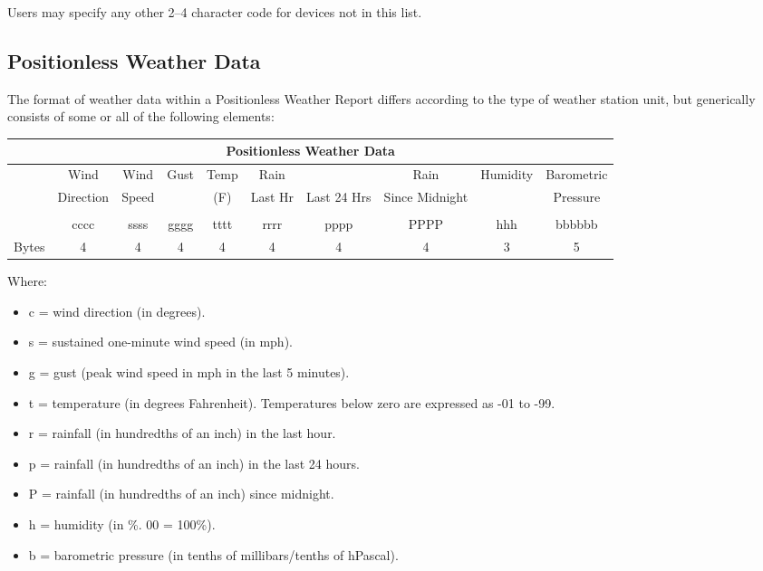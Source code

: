   Users may specify any other 2–4 character code for devices not in this list.



\subsection {Positionless Weather Data}

The format of weather data within a Positionless Weather Report differs
according to the type of weather station unit, but generically consists of some
or all of the following elements:


\begin{tabular}{r|c|c|c|c|c|c|c|c|c|}
  \hline
  \multicolumn{10}{c}{Positionless Weather Data} \\
  \hline
  & Wind  & Wind & Gust & Temp & Rain &  & Rain  & Humidity & Barometric  \\
  & Direction & Speed & & (F) & Last Hr & Last 24 Hrs & Since Midnight & & Pressure \\
  & & & & & & & &  & \\
  & cccc & ssss & gggg & tttt & rrrr & pppp & PPPP & hhh & bbbbbb \\
  \hline 
  Bytes & 4 & 4 & 4 & 4 & 4 & 4 & 4 & 3 & 5 \\
  \hline 
  
\end{tabular}

Where:

\begin{itemize}
\item c = wind direction (in degrees).
\item s = sustained one-minute wind speed (in mph).
\item g = gust (peak wind speed in mph in the last 5 minutes).
\item t = temperature (in degrees Fahrenheit). Temperatures below zero are expressed as -01 to -99.
\item r = rainfall (in hundredths of an inch) in the last hour.
\item p = rainfall (in hundredths of an inch) in the last 24 hours.
\item P = rainfall (in hundredths of an inch) since midnight.
\item h = humidity (in \%. 00 = 100\%).
\item b = barometric pressure (in tenths of millibars/tenths of hPascal).
\end{itemize}



